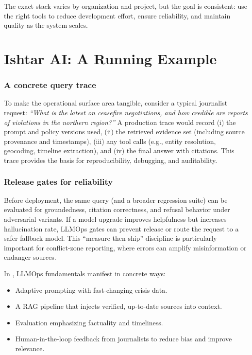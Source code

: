 The exact stack varies by organization and project, but the goal is consistent: use the right tools to reduce development effort, ensure reliability, and maintain quality as the system scales.


\section{Ishtar AI: A Running Example}
\label{sec:ch2-ishtar-running-example}

\subsubsection{A concrete query trace}
To make the operational surface area tangible, consider a typical journalist request:
\emph{``What is the latest on ceasefire negotiations, and how credible are reports of violations in the northern region?''}
A production \ishtar{} trace would record (i) the prompt and policy versions used, (ii) the retrieved evidence set
(including source provenance and timestamps), (iii) any tool calls (e.g., entity resolution, geocoding, timeline extraction),
and (iv) the final answer with citations. This trace provides the basis for reproducibility, debugging, and auditability.

\subsubsection{Release gates for reliability}
Before deployment, the same query (and a broader regression suite) can be evaluated for groundedness, citation correctness,
and refusal behavior under adversarial variants. If a model upgrade improves helpfulness but increases hallucination rate,
LLMOps gates can prevent release or route the request to a safer fallback model. This ``measure-then-ship'' discipline is
particularly important for conflict-zone reporting, where errors can amplify misinformation or endanger sources.


In \ishtar{}, LLMOps fundamentals manifest in concrete ways:
\begin{itemize}
    \item Adaptive prompting with fast-changing crisis data.
    \item A RAG pipeline that injects verified, up-to-date sources into context.
    \item Evaluation emphasizing factuality and timeliness.
    \item Human-in-the-loop feedback from journalists to reduce bias and improve relevance.
\end{itemize}

